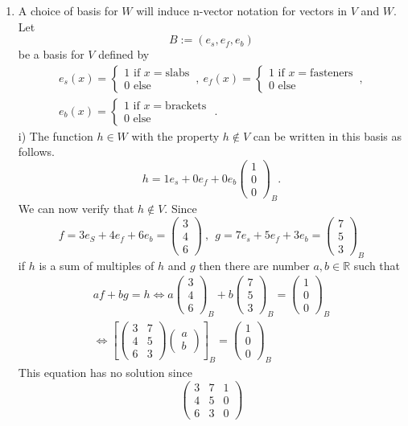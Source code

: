 \documentclass[12pt]{article}
\def\R{{\mathbb{R}}}
\def\b{\beta}
\def\ba{\left(\begin{array}{cc}}
\def\bv{\left(\begin{array}{c}}
\def\ev{\end{array}\right) }
\def\LR{\Leftrightarrow}
\begin{document}
\begin{enumerate}
\begin{enumerate}
\item 
A choice of basis for $W$ will induce n-vector notation for vectors in $V$ and $W$.
Let 
\[B:=( e_s,e_f,e_b)\] 
be a basis for $V$ defined by 
\begin{gather*}
e_s(x)=\left\{ \begin{array}{l} 1 \text{~if~} x=\text{slabs}\\ 0 \text{~else~} \end{array} \right.\, , ~
e_f(x)=\left\{ \begin{array}{l} 1 \text{~if~} x=\text{fasteners}\\ 0 \text{~else~} \end{array} \right.\, , \\
e_b(x)=\left\{ \begin{array}{l} 1 \text{~if~} x=\text{brackets }\\ 0 \text{~else~} \end{array} \right. .
\end{gather*}
i) The function $h\in W$ with the property $h\notin V$ can be written in this basis as follows.
\[h=1e_s+0e_f+0e_b \bv 1\\0\\0 \ev_B.\]
We can now verify that $h\notin V$. Since
\[f=3e_S+4e_f+6e_b=\bv 3\\4\\6 \ev~,~~g=7e_s+5e_f+3e_b = \bv 7\\5\\3 \ev_B\]
if $h$ is  a sum of multiples of $h$ and $g$ then there are number $a,b\in \R$ such that
\begin{gather*}af+bg=h \LR a\bv 3\\4\\6 \ev_B+b \bv 7\\5\\3 \ev_B= \bv 1\\0\\0 \ev_B\\
\LR \left[\ba 3&7 \\4&5\\6&3 \ev \bv a\\b \ev\right]_B= \bv 1\\0\\0 \ev_B\end{gather*}
This equation has no solution since 
\[
\left( \begin{array}{cc|c}
3&7&1\\4&5&0\\6&3&0
\end{array}\right)
\]
\end{enumerate}
\end{enumerate}
\end{document}
